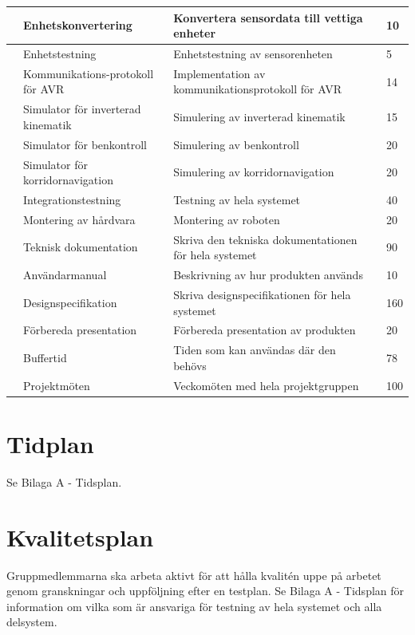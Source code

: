\documentclass[a4paper,titlepage,12pt]{article}
\newcounter{aktNr}
\newcommand{\nextAktNr}{\stepcounter{aktNr}\arabic{aktNr}}
\begin{document}
\begin{longtable}[c]{ c p{4cm} p{6cm} p{2cm} p{2cm}}
		\nextAktNr{} & Enhetskonvertering & Konvertera sensordata till vettiga enheter &  & 10 \\ \midrule
		\nextAktNr{} & Enhetstestning & Enhetstestning av sensorenheten &  & 5 \\ \midrule
		\nextAktNr{} & Kommunikations-protokoll för AVR & Implementation av kommunikationsprotokoll för AVR  &  & 14 \\ \midrule
		\nextAktNr{} & Simulator för inverterad kinematik & Simulering av inverterad kinematik &  & 15 \\ \midrule
		\nextAktNr{} & Simulator för benkontroll & Simulering av benkontroll &  & 20 \\ \midrule
		\nextAktNr{} & Simulator för korridornavigation & Simulering av korridornavigation &  & 20 \\ \midrule
		\nextAktNr{} & Integrationstestning & Testning av hela systemet &  & 40 \\ \midrule
		\nextAktNr{} & Montering av hårdvara & Montering av roboten &  & 20 \\ \midrule
		\nextAktNr{} & Teknisk dokumentation & Skriva den tekniska dokumentationen för hela
                                                            systemet &  & 90 \\ \midrule
		\nextAktNr{} & Användarmanual & Beskrivning av hur produkten används &
        & 10 \\ \midrule
		\nextAktNr{} & Designspecifikation & Skriva designspecifikationen för hela systemet &  & 160 \\ \midrule
		\nextAktNr{} & Förbereda presentation & Förbereda presentation av
        produkten &  & 20 \\ \midrule
		\nextAktNr{} & Buffertid & Tiden som kan användas där den behövs &  &
        78 \\ \midrule
		\nextAktNr{} & Projektmöten & Veckomöten med hela projektgruppen &  & 100 \\ \midrule
	\end{longtable}

	
	\section{Tidplan}
    Se Bilaga A - Tidsplan.
	
	\section{Kvalitetsplan}
	Gruppmedlemmarna ska arbeta aktivt för att hålla kvalitén uppe på arbetet genom 
	granskningar och uppföljning efter en testplan. Se Bilaga A - Tidsplan för
    information om vilka som är ansvariga för testning av hela systemet och alla delsystem.
	
\end{document}

